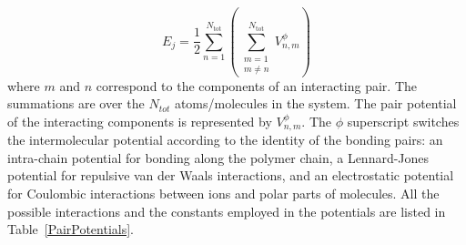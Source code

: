 \documentclass[
journal=jcisd8, %
manuscript=article,
layout=twocolumn   %
]{achemso}
\begin{document}
\begin{equation}
E_j = \frac{1}{2}\sum_{n=1}^{N_{\text{tot}}} \left( \sum_{\substack{m=1 \\ m\neq n}}^{N_{\text{tot}}} V_{n,m}^{\phi} \right)
\label{eqn:Ej}
\end{equation}
where $m$ and $n$ correspond to the components of an interacting pair. The summations are over the $N_{tot}$ atoms/molecules in the system. The pair potential of the interacting components is represented by $V^{\phi}_{n,m}$. The $\phi$ superscript switches the intermolecular potential according to the identity of the bonding pairs: an intra-chain potential for bonding along the polymer chain, a Lennard-Jones potential for repulsive van der Waals interactions, and an electrostatic potential for Coulombic interactions between ions and polar parts of molecules. All the possible interactions and the constants employed in the potentials are listed in Table~\ref{PairPotentials}. 
\end{document}
